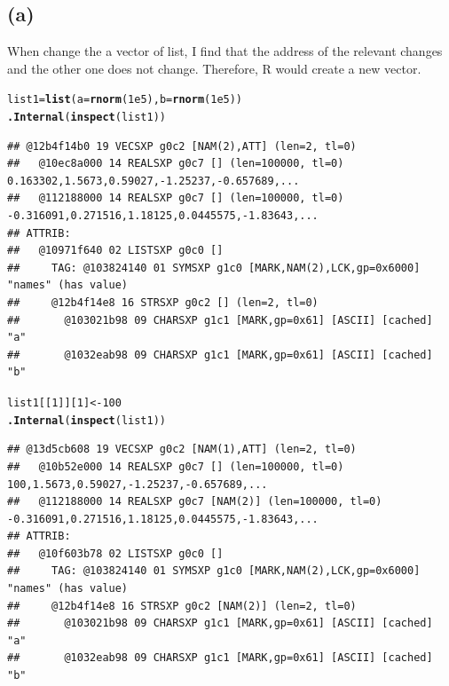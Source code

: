 \documentclass{article}\usepackage[]{graphicx}\usepackage[]{color}
\makeatletter
\newcommand{\hlnum}[1]{\textcolor[rgb]{0.686,0.059,0.569}{#1}}%
\newcommand{\hlstd}[1]{\textcolor[rgb]{0.345,0.345,0.345}{#1}}%
\newcommand{\hlkwb}[1]{\textcolor[rgb]{0.69,0.353,0.396}{#1}}%
\newcommand{\hlkwc}[1]{\textcolor[rgb]{0.333,0.667,0.333}{#1}}%
\newcommand{\hlkwd}[1]{\textcolor[rgb]{0.737,0.353,0.396}{\textbf{#1}}}%
\newenvironment{kframe}{%
 \def\at@end@of@kframe{}%
 \ifinner\ifhmode%
  \def\at@end@of@kframe{\end{minipage}}%
  \begin{minipage}{\columnwidth}%
 \fi\fi%
 \def\FrameCommand##1{\hskip\@totalleftmargin \hskip-\fboxsep
 \colorbox{shadecolor}{##1}\hskip-\fboxsep
     \hskip-\linewidth \hskip-\@totalleftmargin \hskip\columnwidth}%
 \MakeFramed {\advance\hsize-\width
   \@totalleftmargin\z@ \linewidth\hsize
   \@setminipage}}%
 {\par\unskip\endMakeFramed%
 \at@end@of@kframe}
\newenvironment{knitrout}{}{} %
\makeatother
\begin{document}
\subsection{(a)}
When change the a vector of list, I find that the address of the relevant changes and the other one does not change. Therefore, R would create a new vector.
\begin{knitrout}
\color{fgcolor}\begin{kframe}
\begin{alltt}
\hlstd{list1}\hlkwb{=}\hlkwd{list}\hlstd{(}\hlkwc{a}\hlstd{=}\hlkwd{rnorm}\hlstd{(}\hlnum{1e5}\hlstd{),}\hlkwc{b}\hlstd{=}\hlkwd{rnorm}\hlstd{(}\hlnum{1e5}\hlstd{))}
\hlkwd{.Internal}\hlstd{(}\hlkwd{inspect}\hlstd{(list1))}
\end{alltt}
\begin{verbatim}
## @12b4f14b0 19 VECSXP g0c2 [NAM(2),ATT] (len=2, tl=0)
##   @10ec8a000 14 REALSXP g0c7 [] (len=100000, tl=0) 0.163302,1.5673,0.59027,-1.25237,-0.657689,...
##   @112188000 14 REALSXP g0c7 [] (len=100000, tl=0) -0.316091,0.271516,1.18125,0.0445575,-1.83643,...
## ATTRIB:
##   @10971f640 02 LISTSXP g0c0 [] 
##     TAG: @103824140 01 SYMSXP g1c0 [MARK,NAM(2),LCK,gp=0x6000] "names" (has value)
##     @12b4f14e8 16 STRSXP g0c2 [] (len=2, tl=0)
##       @103021b98 09 CHARSXP g1c1 [MARK,gp=0x61] [ASCII] [cached] "a"
##       @1032eab98 09 CHARSXP g1c1 [MARK,gp=0x61] [ASCII] [cached] "b"
\end{verbatim}
\begin{alltt}
\hlstd{list1[[}\hlnum{1}\hlstd{]][}\hlnum{1}\hlstd{]}\hlkwb{<-}\hlnum{100}
\hlkwd{.Internal}\hlstd{(}\hlkwd{inspect}\hlstd{(list1))}
\end{alltt}
\begin{verbatim}
## @13d5cb608 19 VECSXP g0c2 [NAM(1),ATT] (len=2, tl=0)
##   @10b52e000 14 REALSXP g0c7 [] (len=100000, tl=0) 100,1.5673,0.59027,-1.25237,-0.657689,...
##   @112188000 14 REALSXP g0c7 [NAM(2)] (len=100000, tl=0) -0.316091,0.271516,1.18125,0.0445575,-1.83643,...
## ATTRIB:
##   @10f603b78 02 LISTSXP g0c0 [] 
##     TAG: @103824140 01 SYMSXP g1c0 [MARK,NAM(2),LCK,gp=0x6000] "names" (has value)
##     @12b4f14e8 16 STRSXP g0c2 [NAM(2)] (len=2, tl=0)
##       @103021b98 09 CHARSXP g1c1 [MARK,gp=0x61] [ASCII] [cached] "a"
##       @1032eab98 09 CHARSXP g1c1 [MARK,gp=0x61] [ASCII] [cached] "b"
\end{verbatim}
\end{kframe}
\end{knitrout}
\end{document}

